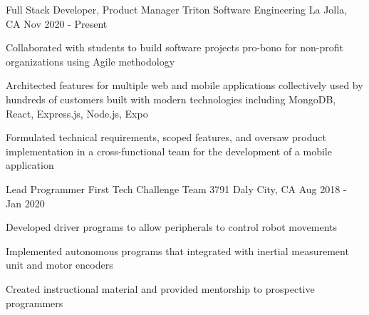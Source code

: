 \begin{cventries}
  \cventry
    {Full Stack Developer, Product Manager} %
    {Triton Software Engineering} %
    {La Jolla, CA} %
    {Nov 2020 - Present} %
    {\begin{cvitems} %
        \item {Collaborated with students to build software projects pro-bono for non-profit organizations using Agile methodology} 
        \item { Architected features for multiple web and mobile applications collectively used by hundreds of customers built with modern technologies including MongoDB, React, Express.js, Node.js, Expo}
        \item { Formulated technical requirements, scoped features, and oversaw product implementation in a cross-functional team for the development of a mobile application }
      \end{cvitems}
    }
  \cventry
    {Lead Programmer} %
    {First Tech Challenge Team 3791} %
    {Daly City, CA} %
    {Aug 2018 - Jan 2020} %
    {\begin{cvitems} %
        \item {Developed driver programs to allow peripherals to control robot movements}
        \item{Implemented autonomous programs that integrated with inertial measurement unit and motor encoders}
        \item{Created instructional material and provided mentorship to prospective programmers}
      \end{cvitems}
    }

\end{cventries}
